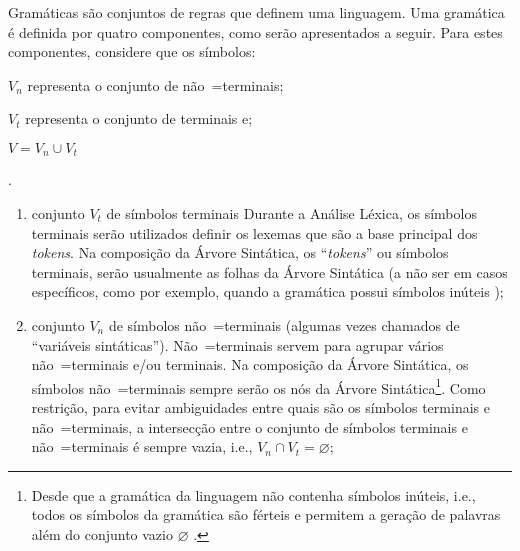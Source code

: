 Gramáticas são conjuntos de regras que definem uma linguagem.
Uma gramática é definida por quatro componentes,
como serão apresentados a seguir.
Para estes componentes,
considere que os símbolos:
\begin{inparaenum}[1)]
\item $V_n$ representa o conjunto de não~=terminais;
\item $V_t$ representa o conjunto de terminais e;
\item $V = V_n \cup V_t$
\end{inparaenum}.
\begin{enumerate}%
    \item {} conjunto $V_t$ de símbolos terminais%
    Durante a Análise Léxica,
    os símbolos terminais serão utilizados definir os lexemas que são a base principal dos \textit{tokens}.
    Na composição da Árvore Sintática,
    os ``\textit{tokens}'' ou símbolos terminais,
    serão usualmente as folhas da Árvore Sintática (a não ser em casos específicos,
    como por exemplo,
    quando a gramática possui símbolos inúteis \cite{hopcroftBook});

    \item {} conjunto $V_n$ de símbolos não~=terminais (algumas vezes chamados de ``variáveis sintáticas'').
    Não~=terminais servem para agrupar vários não~=terminais e\slash{}ou terminais.
    Na composição da Árvore Sintática,
    os símbolos não~=terminais sempre serão os nós da Árvore Sintática\footnote{
    Desde que a gramática da linguagem não contenha símbolos inúteis,
    i.e.,
    todos os símbolos da gramática são férteis e
    permitem a geração de palavras além do conjunto vazio $\varnothing$ \cite{hopcroftBook}.
    }.
    Como restrição,
    para evitar ambiguidades entre quais são os símbolos terminais e
    não~=terminais,
    a intersecção entre o conjunto de símbolos terminais e
    não~=terminais é sempre vazia,
    i.e.,
    $V_n \cap V_t = \varnothing$;


\end{enumerate}
